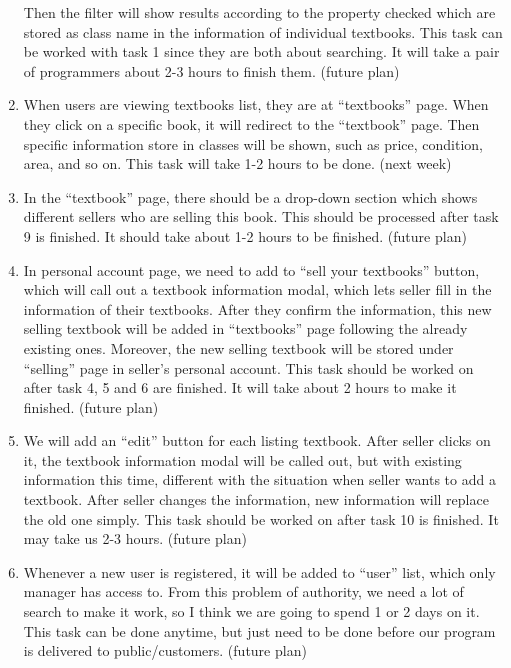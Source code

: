 \documentclass[12pt]{article}
\begin{document}
\begin{enumerate}
		Then the filter will show results according to the property checked which are stored as class name in the information of individual textbooks. 
		This task can be worked with task 1 since they are both about searching. 
		It will take a pair of programmers about 2-3 hours to finish them. (future plan)
		\item When users are viewing textbooks list, they are at “textbooks” page. 
		When they click on a specific book, it will redirect to the “textbook” page. 
		Then specific information store in classes will be shown, such as price, condition, area, and so on. 
		This task will take 1-2 hours to be done. (next week)	
		\item	In the “textbook” page, there should be a drop-down section which shows different sellers who are selling this book. 
		This should be processed after task 9 is finished. 
		It should take about 1-2 hours to be finished. (future plan)
		\item	In personal account page, we need to add to “sell your textbooks” button, which will call out a textbook information modal, which lets seller fill in the information of their textbooks.
		 After they confirm the information, this new selling textbook will be added in “textbooks” page following the already existing ones. 
		 Moreover, the new selling textbook will be stored under “selling” page in seller’s personal account. 
		 This task should be worked on after task 4, 5 and 6 are finished. 
		 It will take about 2 hours to make it finished. (future plan)
		\item	We will add an “edit” button for each listing textbook. 
		After seller clicks on it, the textbook information modal will be called out, but with existing information this time, different with the situation when seller wants to add a textbook. 
		After seller changes the information, new information will replace the old one simply. 
		This task should be worked on after task 10 is finished. 
		It may take us 2-3 hours. (future plan)
		\item	Whenever a new user is registered, it will be added to “user” list, which only manager has access to. 
		From this problem of authority, we need a lot of search to make it work, so I think we are going to spend 1 or 2 days on it. 
		This task can be done anytime, but just need to be done before our program is delivered to public/customers. (future plan)
			
		\end{enumerate}
\end{document}
